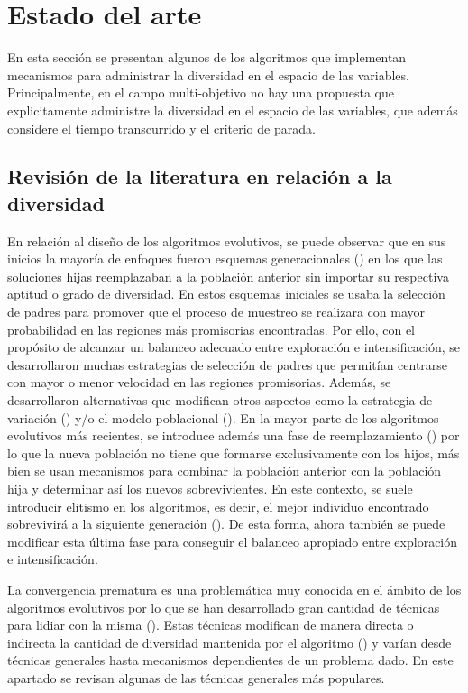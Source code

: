 
\section{Estado del arte}\label{sec:estado_arte}

En esta sección se presentan algunos de los algoritmos que implementan mecanismos para administrar la diversidad en el espacio de las variables.
%
Principalmente, en el campo multi-objetivo no hay una propuesta que explicitamente administre la diversidad en el espacio de las variables, que además considere el tiempo transcurrido y el criterio de parada.
%
\subsection{Revisión de la literatura en relación a la diversidad}

En relación al diseño de los algoritmos evolutivos, se puede observar que en sus inicios la mayoría de enfoques fueron esquemas generacionales (\cite{de2006evolutionary}) en los 
que las soluciones hijas reemplazaban a la población anterior sin importar su respectiva aptitud o grado de diversidad.
%
En estos esquemas iniciales se usaba la selección de padres para promover que el proceso de muestreo se realizara con mayor probabilidad en las regiones más promisorias encontradas. 
%
Por ello, con el propósito de alcanzar un balanceo adecuado entre exploración e intensificación, se desarrollaron muchas estrategias de selección de padres que permitían centrarse con mayor o menor velocidad en las regiones promisorias.
%
Además, se desarrollaron alternativas que modifican otros aspectos como la estrategia de variación (\cite{Joel:herrera2003fuzzy}) y/o 
el modelo poblacional (\cite{alba2005parallel}).
%
En la mayor parte de los algoritmos evolutivos más recientes, se introduce además una fase de reemplazamiento (\cite{eiben2003introduction}) por lo que
la nueva población no tiene que formarse exclusivamente con los hijos, más bien se usan mecanismos para combinar la población anterior con la población hija y determinar así los nuevos sobrevivientes.
%
En este contexto, se suele introducir elitismo en los algoritmos, es decir, el mejor individuo encontrado sobrevivirá a la siguiente generación (\cite{Joel:CHC}).
%
De esta forma, ahora también se puede modificar esta última fase para conseguir el balanceo apropiado entre exploración e intensificación.

La convergencia prematura es una problemática muy conocida en el ámbito de los algoritmos evolutivos por lo que se han desarrollado gran cantidad de técnicas 
para lidiar con la misma (\cite{pandey2014comparative}).
%
Estas técnicas modifican de manera directa o indirecta la cantidad de diversidad mantenida por el algoritmo (\cite{Joel:Crepinsek})
y varían desde técnicas generales hasta mecanismos dependientes de un problema dado.
%
En este apartado se revisan algunas de las técnicas generales más populares.

